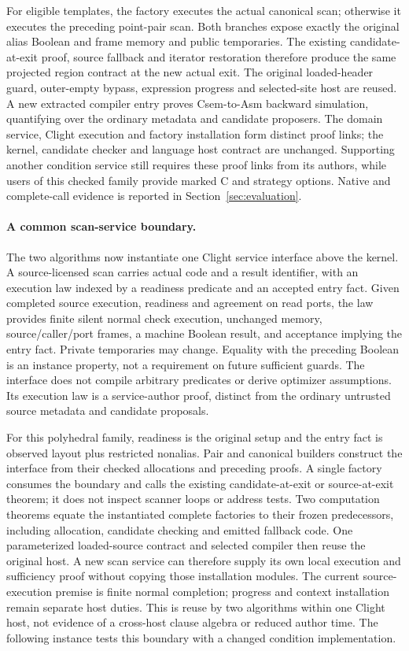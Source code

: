 For eligible templates, the factory executes the actual canonical scan; otherwise
it executes the preceding point-pair scan. Both branches expose exactly the
original alias Boolean and frame memory and public temporaries. The existing
candidate-at-exit proof, source fallback and iterator restoration therefore
produce the same projected region contract at the new actual exit. The original
loaded-header guard, outer-empty bypass, expression progress and selected-site
host are reused. A new extracted compiler entry proves Csem-to-Asm backward
simulation, quantifying over the ordinary metadata and candidate proposers.
The domain service, Clight execution and factory installation form distinct
proof links; the kernel, candidate checker and language host contract are
unchanged. Supporting another condition service still requires these proof
links from its authors, while users of this checked family provide marked C
and strategy options. Native and complete-call evidence is reported in
Section~\ref{sec:evaluation}.

\paragraph{A common scan-service boundary.}
The two algorithms now instantiate one Clight service interface above the
kernel. A source-licensed scan carries actual code and a result identifier,
with an execution law indexed by a readiness predicate and an accepted entry
fact. Given completed source execution, readiness and agreement on read ports,
the law provides finite silent normal check execution, unchanged memory,
source/caller/port frames, a machine Boolean result, and acceptance implying
the entry fact. Private temporaries may change. Equality with the preceding
Boolean is an instance property, not a requirement on future sufficient guards.
The interface does not compile arbitrary predicates or derive optimizer
assumptions. Its execution law is a service-author proof, distinct from the
ordinary untrusted source metadata and candidate proposals.

For this polyhedral family, readiness is the original setup and the entry fact
is observed layout plus restricted nonalias. Pair and canonical builders
construct the interface from their checked allocations and preceding proofs.
A single factory consumes the boundary and calls the existing candidate-at-exit
or source-at-exit theorem; it does not inspect scanner loops or address tests.
Two computation theorems equate the instantiated complete factories to their
frozen predecessors, including allocation, candidate checking and emitted
fallback code. One parameterized loaded-source contract and selected compiler
then reuse the original host. A new scan service can therefore supply its own
local execution and sufficiency proof without copying those installation
modules. The current source-execution premise is finite normal completion;
progress and context installation remain separate host duties. This is reuse
by two algorithms within one Clight host, not evidence of a cross-host clause
algebra or reduced author time. The following instance tests this boundary
with a changed condition implementation.

